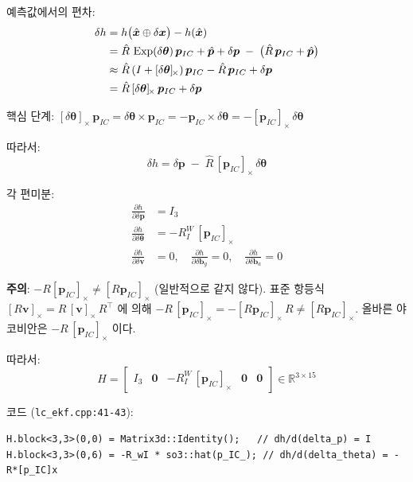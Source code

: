 \documentclass[11pt,a4paper,oneside]{report}
\newcommand{\R}{\mathbb{R}}
\newcommand{\skewop}[1]{[#1]_{\!\times}}
\DeclareMathOperator{\Exp}{Exp}
\begin{document}
예측값에서의 편차:
\begin{align}
\delta h &= h\bigl(\hat{\bm{x}} \oplus \delta\bm{x}\bigr) - h(\hat{\bm{x}}) \notag\\
&= \hat{R}\,\Exp(\delta\bm{\theta})\,\bm{p}_{IC} + \hat{\bm{p}} + \delta\bm{p}
   \;-\; \bigl(\hat{R}\,\bm{p}_{IC} + \hat{\bm{p}}\bigr) \notag\\
&\approx \hat{R}\,(I + \skewop{\delta\bm{\theta}})\,\bm{p}_{IC} - \hat{R}\,\bm{p}_{IC} + \delta\bm{p} \notag\\
&= \hat{R}\,\skewop{\delta\bm{\theta}}\,\bm{p}_{IC} + \delta\bm{p}
\end{align}

핵심 단계: \(\skewop{\delta\bm{\theta}}\,\bm{p}_{IC} = \delta\bm{\theta} \times \bm{p}_{IC} = -\bm{p}_{IC}\times\delta\bm{\theta} = -\skewop{\bm{p}_{IC}}\,\delta\bm{\theta}\)

따라서:
\begin{equation}
\delta h = \delta\bm{p} \;-\; \hat{R}\,\skewop{\bm{p}_{IC}}\,\delta\bm{\theta}
\end{equation}

각 편미분:
\begin{align}
\frac{\partial h}{\partial \delta\bm{p}} &= I_3 \\
\frac{\partial h}{\partial \delta\bm{\theta}} &= -R^W_I\,[\bm{p}_{IC}]_\times \\
\frac{\partial h}{\partial \delta\bm{v}} &= 0, \quad
\frac{\partial h}{\partial \delta\bm{b}_g} = 0, \quad
\frac{\partial h}{\partial \delta\bm{b}_a} = 0
\end{align}

\begin{kbox}
\textbf{주의}: \(-R[\bm{p}_{IC}]_\times \neq [R\bm{p}_{IC}]_\times\) (일반적으로 같지 않다).
표준 항등식 \([R\bm{v}]_\times = R\,[\bm{v}]_\times\,R^\top\) 에 의해
\(-R\,[\bm{p}_{IC}]_\times = -[R\bm{p}_{IC}]_\times\,R \neq [R\bm{p}_{IC}]_\times\).
올바른 야코비안은 \(-R\,[\bm{p}_{IC}]_\times\) 이다.
\end{kbox}

따라서:
\begin{equation}
\boxed{H = \begin{bmatrix} I_3 & \bm{0} & -R^W_I\,[\bm{p}_{IC}]_\times & \bm{0} & \bm{0} \end{bmatrix} \in \R^{3 \times 15}}
\end{equation}

코드 (\texttt{lc\_ekf.cpp:41-43}):
\begin{lstlisting}[style=cpp]
H.block<3,3>(0,0) = Matrix3d::Identity();   // dh/d(delta_p) = I
H.block<3,3>(0,6) = -R_wI * so3::hat(p_IC_); // dh/d(delta_theta) = -R*[p_IC]x
\end{lstlisting}
\end{document}
